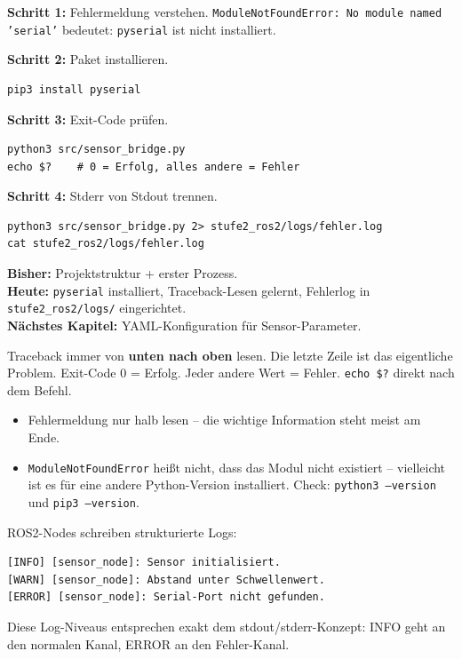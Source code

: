 \begin{loesungBox}
\textbf{Schritt 1:} Fehlermeldung verstehen.
\texttt{ModuleNotFoundError: No module named 'serial'}
bedeutet: \texttt{pyserial} ist nicht installiert.

\textbf{Schritt 2:} Paket installieren.
\begin{lstlisting}[style=bash]
pip3 install pyserial
\end{lstlisting}

\textbf{Schritt 3:} Exit-Code prüfen.
\begin{lstlisting}[style=bash]
python3 src/sensor_bridge.py
echo $?    # 0 = Erfolg, alles andere = Fehler
\end{lstlisting}

\textbf{Schritt 4:} Stderr von Stdout trennen.
\begin{lstlisting}[style=bash]
python3 src/sensor_bridge.py 2> stufe2_ros2/logs/fehler.log
cat stufe2_ros2/logs/fehler.log
\end{lstlisting}
\end{loesungBox}

\begin{projektBox}
\textbf{Bisher:} Projektstruktur + erster Prozess.\\
\textbf{Heute:} \texttt{pyserial} installiert, Traceback-Lesen gelernt,
Fehlerlog in \texttt{stufe2\_ros2/logs/} eingerichtet.\\
\textbf{Nächstes Kapitel:} YAML-Konfiguration für Sensor-Parameter.
\end{projektBox}

\begin{merksatzBox}
Traceback immer von \textbf{unten nach oben} lesen.
Die letzte Zeile ist das eigentliche Problem.
Exit-Code 0 = Erfolg. Jeder andere Wert = Fehler.
\texttt{echo \$?} direkt nach dem Befehl.
\end{merksatzBox}

\begin{fehlerBox}
\begin{itemize}
  \item Fehlermeldung nur halb lesen -- die wichtige Information
        steht meist am Ende.
  \item \texttt{ModuleNotFoundError} heißt nicht, dass das Modul
        nicht existiert -- vielleicht ist es für eine andere
        Python-Version installiert.
        Check: \texttt{python3 --version} und \texttt{pip3 --version}.
\end{itemize}
\end{fehlerBox}

\begin{robotikBox}
ROS2-Nodes schreiben strukturierte Logs:
\begin{lstlisting}[style=bash]
[INFO] [sensor_node]: Sensor initialisiert.
[WARN] [sensor_node]: Abstand unter Schwellenwert.
[ERROR] [sensor_node]: Serial-Port nicht gefunden.
\end{lstlisting}
Diese Log-Niveaus entsprechen exakt dem stdout/stderr-Konzept:
INFO geht an den normalen Kanal, ERROR an den Fehler-Kanal.
\end{robotikBox}
